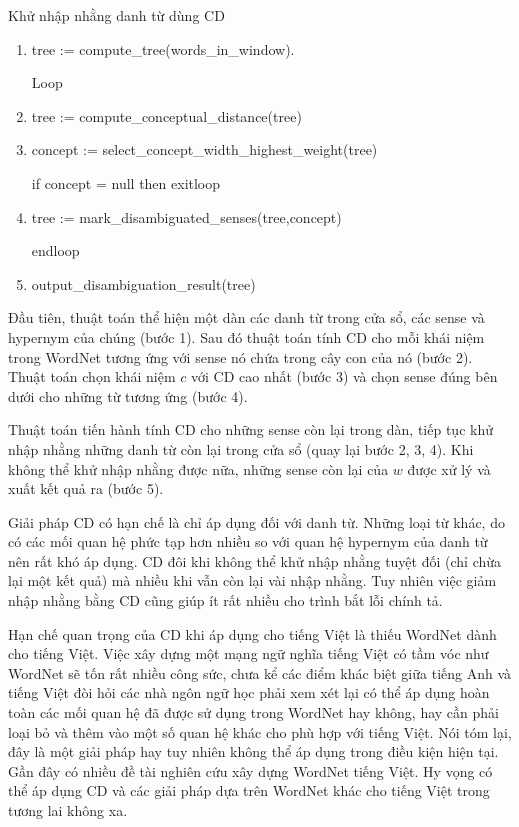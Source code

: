 \documentclass[a4paper,oneside,14pt]{extbook} %
\begin{document}
\begin{algo}
\caption{Khử nhập nhằng danh từ dùng CD}
\label{algo:CD}
  \begin{enumerate}
  \item tree := compute\_tree(words\_in\_window).

    Loop
  \item tree := compute\_conceptual\_distance(tree)
  \item concept := select\_concept\_width\_highest\_weight(tree)
    
    if concept = null then exitloop
  \item tree := mark\_disambiguated\_senses(tree,concept)

    endloop
  \item output\_disambiguation\_result(tree)
  \end{enumerate}
\end{algo}

Đầu tiên, thuật toán thể hiện một dàn các danh từ trong cửa sổ, các
sense và hypernym của chúng (bước 1). Sau đó thuật toán tính
CD cho mỗi khái niệm trong WordNet tương ứng với sense
nó chứa trong cây con của nó (bước 2). Thuật toán chọn khái niệm $c$
với CD cao nhất (bước 3) và chọn sense đúng bên dưới
cho  những từ tương ứng (bước 4).

Thuật toán tiến hành tính CD cho những sense còn lại trong dàn, tiếp
tục khử nhập nhằng những danh từ còn lại trong cửa sổ (quay lại bước
2, 3, 4). Khi không thể khử nhập nhằng được nữa, những sense còn lại
của $w$ được xử lý và xuất kết quả ra (bước 5).

Giải pháp CD có hạn chế là chỉ áp dụng đối với danh từ. Những loại từ
khác, do có các mối quan hệ phức tạp hơn nhiều so với quan hệ hypernym
của danh từ nên rất khó áp dụng. CD đôi khi không thể khử nhập nhằng
tuyệt đối (chỉ chừa lại một kết quả) mà nhiều khi vẫn còn lại vài nhập
nhằng. Tuy nhiên việc giảm nhập nhằng bằng CD cũng giúp ít rất nhiều
cho trình bắt lỗi chính tả. 

Hạn chế quan trọng của CD khi áp dụng cho
tiếng Việt là thiếu WordNet dành cho tiếng Việt. Việc xây dựng một
mạng ngữ nghĩa tiếng Việt có tầm vóc như WordNet sẽ tốn rất nhiều công
sức, chưa kể các điểm khác biệt giữa tiếng Anh và tiếng Việt đòi hỏi
các nhà ngôn ngữ học phải xem xét lại có thể áp dụng hoàn toàn các mối quan hệ
đã được sử dụng trong WordNet hay không, hay cần phải loại bỏ và thêm
vào một số quan hệ khác cho phù hợp với tiếng Việt. Nói tóm lại, đây
là một giải pháp hay tuy nhiên không thể áp dụng trong điều kiện hiện
tại. Gần đây có nhiều đề tài nghiên cứu xây dựng WordNet tiếng
Việt. Hy vọng có thể áp dụng CD và các giải pháp dựa trên WordNet khác
cho tiếng Việt trong tương lai không xa.
\end{document}
